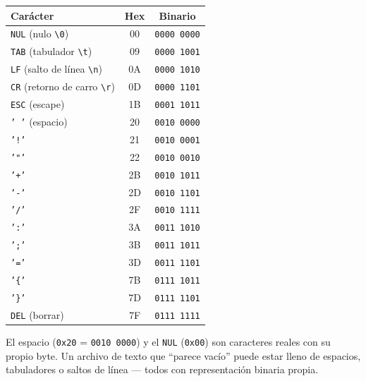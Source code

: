 \documentclass[12pt, oneside]{article}
\begin{document}
\begin{center}
\begin{tabular}{lcc}
  \toprule
  \textbf{Carácter} & \textbf{Hex} & \textbf{Binario} \\
  \midrule
  \texttt{NUL} (nulo \texttt{\textbackslash 0})        & 00 & \texttt{0000 0000} \\
  \texttt{TAB} (tabulador \texttt{\textbackslash t})   & 09 & \texttt{0000 1001} \\
  \texttt{LF}  (salto de línea \texttt{\textbackslash n}) & 0A & \texttt{0000 1010} \\
  \texttt{CR}  (retorno de carro \texttt{\textbackslash r}) & 0D & \texttt{0000 1101} \\
  \texttt{ESC} (escape)                                & 1B & \texttt{0001 1011} \\
  \midrule
  \texttt{' '} (espacio)   & 20 & \texttt{0010 0000} \\
  \texttt{'!'}             & 21 & \texttt{0010 0001} \\
  \texttt{'"'}             & 22 & \texttt{0010 0010} \\
  \texttt{'+'}             & 2B & \texttt{0010 1011} \\
  \texttt{'-'}             & 2D & \texttt{0010 1101} \\
  \texttt{'/'}             & 2F & \texttt{0010 1111} \\
  \midrule
  \texttt{':'}             & 3A & \texttt{0011 1010} \\
  \texttt{';'}             & 3B & \texttt{0011 1011} \\
  \texttt{'='}             & 3D & \texttt{0011 1101} \\
  \midrule
  \texttt{'\{'}            & 7B & \texttt{0111 1011} \\
  \texttt{'\}'}            & 7D & \texttt{0111 1101} \\
  \texttt{DEL} (borrar)    & 7F & \texttt{0111 1111} \\
  \bottomrule
\end{tabular}
\end{center}

\begin{recuerda}
  El espacio (\texttt{0x20} = \texttt{0010 0000}) y el \texttt{NUL}
  (\texttt{0x00}) son caracteres reales con su propio byte.
  Un archivo de texto que ``parece vacío'' puede estar lleno de espacios,
  tabuladores o saltos de línea — todos con representación binaria propia.
\end{recuerda}
\end{document}

